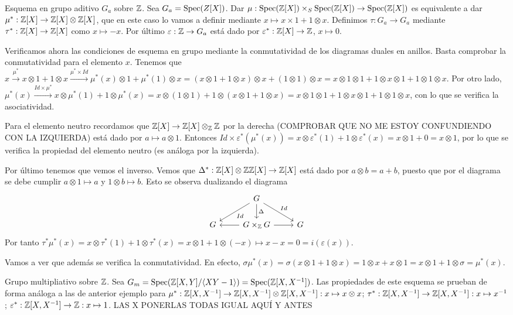 \documentclass[GA.tex]{subfiles}
\begin{document}
\begin{ej}
Esquema en grupo aditivo $G_a$ sobre $\mathbb{Z}$. Sea $G_a=\operatorname{Spec}(Z[X])$. Dar $\mu:\operatorname{Spec}(\mathbb{Z}[X])\times_S\operatorname{Spec}(\mathbb{Z}[X])\to\operatorname{Spec}(\mathbb{Z}[X])$ es equivalente a dar $\mu^*:\mathbb{Z}[X]\to \mathbb{Z}[X]\otimes\mathbb{Z}[X]$, que en este caso lo vamos a definir mediante $x\mapsto x\times 1+1\otimes x$. Definimos $\tau:G_a\to G_a$ mediante $\tau^*:\mathbb{Z}[X]\to\mathbb{Z}[X]$ como $x\mapsto -x$. Por último $\varepsilon:\mathbb{Z}\to G_a$ está dado por $\varepsilon^*:\mathbb{Z}[X]\to\mathbb{Z}$, $x\mapsto 0$. 

Verificamos ahora las condiciones de esquema en grupo mediante la conmutatividad de los diagramas duales en anillos. Basta comprobar la conmutatividad para el elemento $x$. Tenemos que $x\xrightarrow{\mu^*}x\otimes 1+1\otimes x\xrightarrow{\mu^*\times Id} \mu^*(x)\otimes 1+\mu^*(1)\otimes x=(x\otimes 1+1\otimes x)\otimes x+(1\otimes 1)\otimes x=x\otimes 1\otimes 1+1\otimes x\otimes 1+1\otimes 1\otimes x$. Por otro lado, $\mu^*(x)\xrightarrow{Id\times\mu^*} x\otimes\mu^*(1)+1\otimes\mu^*(x)=x\otimes(1\otimes 1)+1\otimes(x\otimes 1+1\otimes x)=x\otimes 1\otimes 1+ 1\otimes x\otimes 1+1\otimes 1\otimes x$, con lo que se verifica la asociatividad. 

Para el elemento neutro recordamos que $\mathbb{Z}[X]\to\mathbb{Z}[X]\otimes_{\mathbb{Z}}\mathbb{Z}$ por la derecha (COMPROBAR QUE NO ME ESTOY CONFUNDIENDO CON LA IZQUIERDA) está dado por $a\mapsto a\otimes 1$. Entonces $Id\times\varepsilon^*(\mu^*(x))=x\otimes \varepsilon^*(1)+1\otimes\varepsilon^*(x)=x\otimes 1+0=x\otimes 1$, por lo que se verifica la propiedad del elemento neutro (es análoga por la izquierda).

Por último tenemos que vemos el inverso. Vemos que $\Delta^*:\mathbb{Z}[X]\otimes\mathbb{Z}\mathbb{Z}[X]\to \mathbb{Z}[X]$ está dado por $a\otimes b=a+b$, puesto que por el diagrama se debe cumplir $a\otimes 1\mapsto a$ y $1\otimes b\mapsto b$. Esto se observa dualizando el diagrama
\[
\begin{tikzcd}
& G\arrow[ld, "Id"] \arrow[rd, "Id"]\arrow[d, "\Delta"] & \\
G & G\times_\Z G\arrow[l]\arrow[r] & G
\end{tikzcd}
\]
Por tanto $\tau^*\mu^*(x)=x\otimes\tau^*(1)+1\otimes\tau^*(x)=x\otimes 1+1\otimes(-x)\mapsto x-x=0=i(\varepsilon(x))$. 

Vamos a ver que además se verifica la conmutatividad. En efecto, $\sigma\mu^*(x)=\sigma(x\otimes 1+1\otimes x)=1\otimes x+x\otimes 1=x\otimes 1+1\otimes \sigma=\mu^*(x)$. 
\end{ej}

\begin{ej}
Grupo multipliativo sobre $\mathbb{Z}$. Sea $G_m=\operatorname{Spec}(\mathbb{Z}[X,Y]/\langle{XY-1}\rangle)=\operatorname{Spec}(\mathbb{Z}[X,X^{-1}])$. Las propiedades de este esquema se prueban de forma análoga a las de anterior ejemplo para $\mu^*:\mathbb{Z}[X,X^{-1}]\to\mathbb{Z}[X,X^{-1}]\otimes \mathbb{Z}[X,X^{-1}]: x\mapsto x\otimes x$; $\tau^*:\mathbb{Z}[X,X^{-1}]\to \mathbb{Z}[X,X^{-1}]: x\mapsto x^{-1}$; $\varepsilon^*:\mathbb{Z}[X,X^{-1}]\to\mathbb{Z}: x\mapsto 1$. LAS X PONERLAS TODAS IGUAL AQUÍ Y ANTES
\end{ej}
\end{document}

